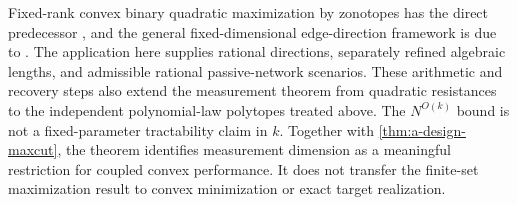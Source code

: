 Fixed-rank convex binary quadratic maximization by zonotopes has the
direct predecessor \citet{ferrez2005-fixed-rank}, and the general
fixed-dimensional edge-direction framework is due to
\citet{onn2004-convex}.  The application here supplies rational
directions, separately refined algebraic lengths, and admissible
rational passive-network scenarios.  These arithmetic and recovery
steps also extend the measurement theorem from quadratic resistances
to the independent polynomial-law polytopes treated above.  The
$N^{O(k)}$ bound is not a fixed-parameter tractability claim in
$k$.  Together with \cref{thm:a-design-maxcut}, the theorem identifies
measurement dimension as a meaningful restriction for coupled convex
performance. It does not transfer the finite-set maximization result to
convex minimization or exact target realization.
